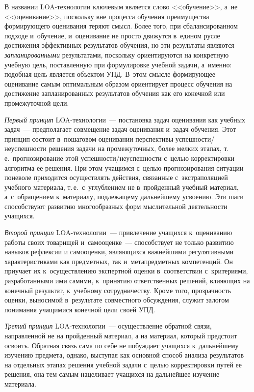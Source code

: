 \begin{multicols}{2}
  В названии LOA-технологии ключевым является слово <<обучение>>, а~не
<<оценивание>>, поскольку вне процесса обучения преимущества фор\-ми\-ру\-юще\-го оценивания
теряют смысл. Более того, при сбалансированном подходе и~обучение, и~оценивание не просто
движутся в~едином русле достижения эффективных результатов обучения, но эти результаты
являются \textit{запланированными} результатами, поскольку ориентируются на конкретную
учебную цель, поставленную при формулировке учебной задачи, а~именно: подобная цель
является объектом УПД. В~этом смысле формирующее оценивание самым оптимальным
образом ориентирует процесс обучения на достижение запланированных результатов обучения
как его конечной или промежуточной цели.

  \textit{Первый принцип} LOA-тех\-но\-ло\-гии~--- постановка задач оценивания как учебных
задач~--- предполагает совмещение задач оценивания и~задач обучения. Этот принцип состоит в~пошаговом оценивании перспективы успешности/неуспешности решения задачи на
промежуточных, более мелких этапах, т.\,е.\ прогнозирование этой успешности/неуспешности
с~целью корректировки алгоритма ее решения. При этом учащимся с~целью прогнозирования
ситуации поневоле приходится осуществлять действия, связанные с~экстраполяцией учебного
материала, т.\,е.\ с~углублением не в~пройденный учебный материал, а~с~обращением
к~материалу, подлежащему дальнейшему усвоению. Эти шаги способствуют развитию
многообразных форм мыслительной деятельности учащихся.


  \textit{Второй принцип} LOA-тех\-но\-ло\-гии~--- при\-вле\-чение учащихся к~оцениванию
работы своих товарищей и~самооценке~--- способствует не только \mbox{развитию} навыков рефлексии
и самооценки, являющихся важнейшими регулятивными характеристиками как предметных,
так и~метапредметных компетенций. Он приучает их к~осуществлению экспертной оценки в~соответствии с~критериями, разработанными ими самими, к~принятию ответственных решений,
влияющих на конечный результат, к~учебному сотрудничеству. Кроме того, прозрачность
оценки, выносимой в~результате совместного обсуждения, служит залогом понимания
учащимися конечной цели своей УПД.

  \textit{Третий принцип} LOA-тех\-но\-ло\-гии~--- осуществление обратной связи,
направленной не на пройденный материал, а на материал, который предстоит освоить. Обратная
связь сама по себе не побуждает учащихся к~дальнейшему изучению предмета, однако, выступая
как основной способ анализа результатов на отдельных этапах решения учебной задачи с~целью
корректировки путей ее решения, она тем самым нацеливает учащихся на дальнейшее изучение
материала.


\end{multicols}
